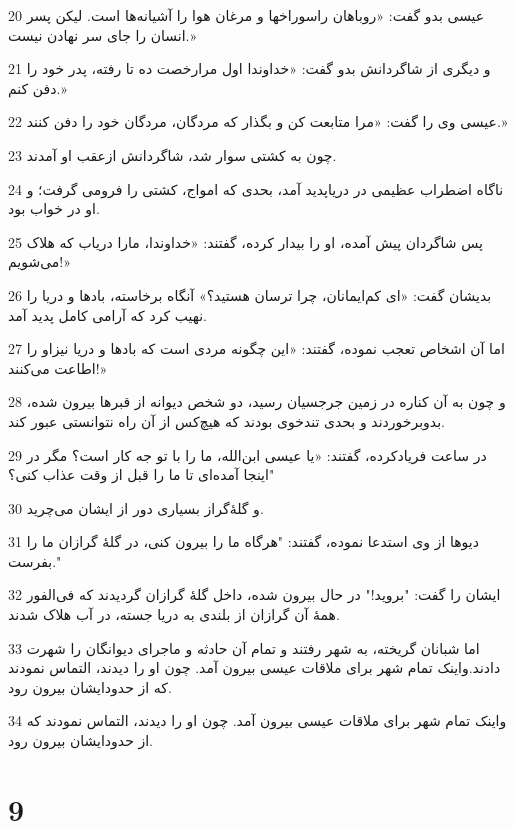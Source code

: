 \par 20 عیسی بدو گفت: «روباهان راسوراخها و مرغان هوا را آشیانه‌ها است. لیکن پسر انسان را جای سر نهادن نیست.»
\par 21 و دیگری از شاگردانش بدو گفت: «خداوندا اول مرارخصت ده تا رفته، پدر خود را دفن کنم.»
\par 22 عیسی وی را گفت: «مرا متابعت کن و بگذار که مردگان، مردگان خود را دفن کنند.»
\par 23 چون به کشتی سوار شد، شاگردانش ازعقب او آمدند.
\par 24 ناگاه اضطراب عظیمی در دریاپدید آمد، بحدی که امواج، کشتی را فرومی گرفت؛ و او در خواب بود.
\par 25 پس شاگردان پیش آمده، او را بیدار کرده، گفتند: «خداوندا، مارا دریاب که هلاک می‌شویم!»
\par 26 بدیشان گفت: «ای کم‌ایمانان، چرا ترسان هستید؟» آنگاه برخاسته، بادها و دریا را نهیب کرد که آرامی کامل پدید آمد.
\par 27 اما آن اشخاص تعجب نموده، گفتند: «این چگونه مردی است که بادها و دریا نیزاو را اطاعت می‌کنند!»
\par 28 و چون به آن کناره در زمین جرجسیان رسید، دو شخص دیوانه از قبرها بیرون شده، بدوبرخوردند و بحدی تندخوی بودند که هیچ‌کس از آن راه نتوانستی عبور کند.
\par 29 در ساعت فریادکرده، گفتند: «یا عیسی ابن‌الله، ما را با تو جه کار است؟ مگر در اینجا آمده‌ای تا ما را قبل از وقت عذاب کنی؟"
\par 30 و گلۀگراز بسیاری دور از ایشان می‌چرید.
\par 31 دیوها از وی استدعا نموده، گفتند: "هرگاه ما را بیرون کنی، در گلۀ گرازان ما را بفرست."
\par 32 ایشان را گفت: "بروید!" در حال بیرون شده، داخل گلۀ گرازان گردیدند که فی‌الفور همۀ آن گرازان از بلندی به دریا جسته، در آب هلاک شدند.
\par 33 اما شبانان گریخته، به شهر رفتند و تمام آن حادثه و ماجرای دیوانگان را شهرت دادند.واینک تمام شهر برای ملاقات عیسی بیرون آمد. چون او را دیدند، التماس نمودند که از حدودایشان بیرون رود.
\par 34 واینک تمام شهر برای ملاقات عیسی بیرون آمد. چون او را دیدند، التماس نمودند که از حدودایشان بیرون رود.

\chapter{9}

